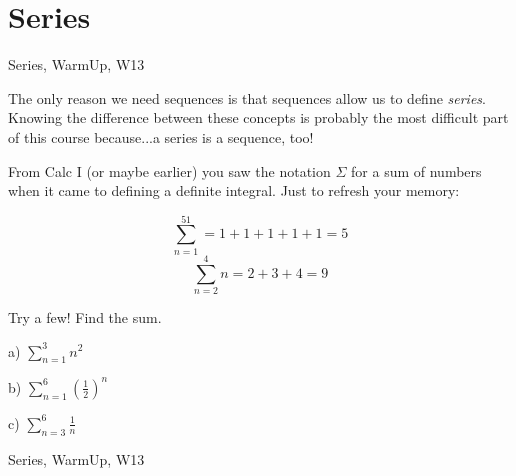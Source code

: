 \section{Series}

\begin{tagblock}{Series, WarmUp, W13}
\begin{question}

The only reason we need sequences is that sequences allow us to define \textit{series}. Knowing the difference between these concepts is probably the most difficult part of this course because...a series is a sequence, too!

From Calc I (or maybe earlier) you saw the notation $\Sigma$ for a sum of numbers when it came to defining a definite integral. Just to refresh your memory:

\bigskip
\[
\sum_{n=1}^51=1+1+1+1+1=5
\]
\bigskip
\[
\sum_{n=2}^4n=2+3+4=9
\]

Try a few! Find the sum.

\bigskip

a) $\displaystyle\sum_{n=1}^3n^2$
 
\bigskip

b) $\displaystyle\sum_{n=1}^6\left(\frac 1 2\right)^n$

\bigskip

c) $\displaystyle\sum_{n=3}^6\frac 1 n$
	
	
\begin{tags}
	    Series, WarmUp, W13
\end{tags}
	
\begin{diary}
	    
\end{diary}
	
\begin{solution}
	   
\end{solution}
	
\end{question}

\end{tagblock}


 

